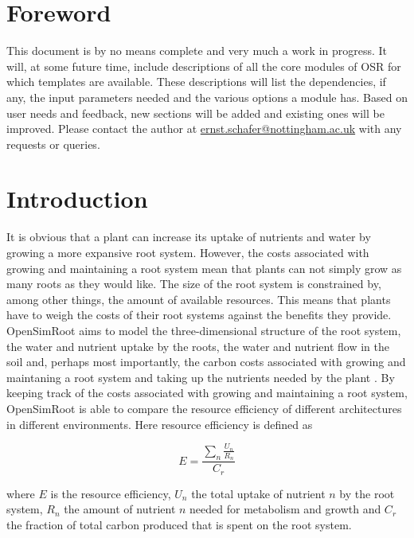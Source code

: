 \documentclass{article}
\begin{document}
\section{Foreword}

This document is by no means complete and very much a work in progress. It will, at some future time, include descriptions of all the core modules of OSR for which templates are available. These descriptions will list the dependencies, if any, the input parameters needed and the various options a module has. Based on user needs and feedback, new sections will be added and existing ones will be improved. Please contact the author at \href{ernst.schafer@nottingham.ac.uk}{ernst.schafer@nottingham.ac.uk} with any requests or queries.

\section{Introduction}

\noindent It is obvious that a plant can increase its uptake of nutrients and water by growing a more expansive root system. However, the costs associated with growing and maintaining a root system mean that plants can not simply grow as many roots as they would like. The size of the root system is constrained by, among other things, the amount of available resources. This means that plants have to weigh the costs of their root systems against the benefits they provide. OpenSimRoot aims to model the three-dimensional structure of the root system, the water and nutrient uptake by the roots, the water and nutrient flow in the soil and, perhaps most importantly, the carbon costs associated with growing and maintaning a root system and taking up the nutrients needed by the plant \cite{Postma2017}. By keeping track of the costs associated with growing and maintaining a root system, OpenSimRoot is able to compare the resource efficiency of different architectures in different environments. Here resource efficiency is defined as 

$$E = \frac{\sum_{n} \frac{U_n}{R_n}}{C_r} $$

\noindent where $E$ is the resource efficiency, $U_n$ the total uptake of nutrient $n$ by the root system, $R_n$ the amount of nutrient $n$ needed for metabolism and growth and $C_r$ the fraction of total carbon produced that is spent on the root system. \newline
\end{document}
